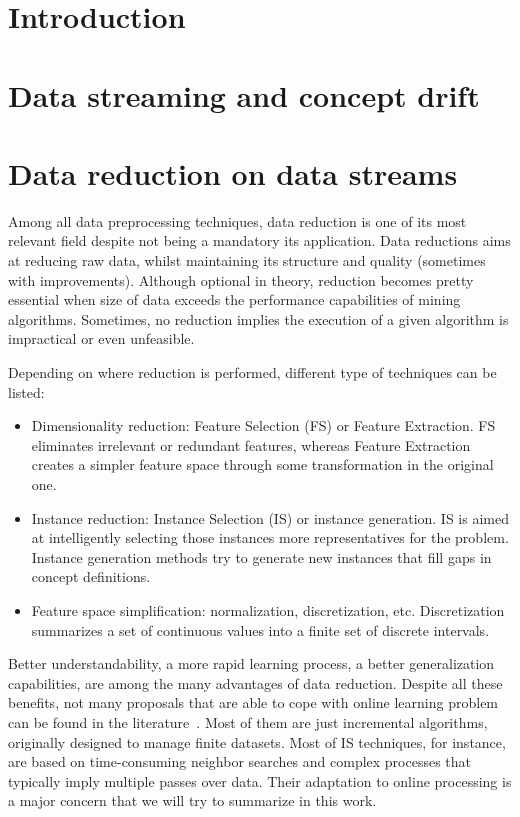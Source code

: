\documentclass[preprint,12pt]{elsarticle}
\begin{document}

\section{Introduction}
\label{sec:intro}



\section{Data streaming and concept drift}
\label{sec:stream}

\section{Data reduction on data streams}

Among all data preprocessing techniques, data reduction is one of its most relevant field despite not being a mandatory its application. Data reductions  aims at reducing raw data, whilst maintaining its structure and quality (sometimes with improvements). Although optional in theory, reduction becomes pretty essential when size of data exceeds the performance capabilities of mining algorithms. Sometimes, no reduction implies the execution of a given algorithm is impractical or even unfeasible. 

Depending on where reduction is performed, different type of techniques can be listed:

\begin{itemize}
	\item Dimensionality reduction: Feature Selection (FS) or Feature Extraction. FS eliminates irrelevant or redundant features, whereas Feature Extraction creates a simpler feature space through some transformation in the original one.
	\item Instance reduction: Instance Selection (IS) or instance generation. IS is aimed at intelligently selecting those instances more representatives for the problem. Instance generation methods try to generate new instances that fill gaps in concept definitions.
	\item Feature space simplification: normalization, discretization, etc. Discretization summarizes a set of continuous values into a finite set of discrete intervals.
\end{itemize}

Better understandability, a more rapid learning process, a better generalization capabilities, are among the many advantages of data reduction. Despite all these benefits, not many proposals that are able to cope with online learning problem can be found in the literature~\cite{garcia14}. Most of them are just incremental algorithms, originally designed to manage finite datasets. Most of IS techniques, for instance, are based on time-consuming neighbor searches and complex processes that typically imply multiple passes over data. Their adaptation to online processing is a major concern that we will try to summarize in this work.
\end{document}
